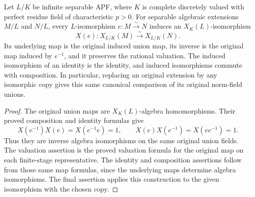 \begin{lemma}
\label{fw:separable-norm-union-congruence}
\leanok
Let $L/K$ be infinite separable APF, where $K$ is complete discretely
valued with perfect residue field of characteristic $p>0$.
For separable algebraic extensions $M/L$ and $N/L$, every
$L$-isomorphism $e:M\xrightarrow{\sim}N$ induces an
$X_K(L)$-isomorphism
\[
 X(e):X_{L/K}(M)\xrightarrow{\sim}X_{L/K}(N).
\]
Its underlying map is the original induced union map, its inverse is
the original map induced by $e^{-1}$, and it preserves the rational
valuation. The induced isomorphism of an identity is the identity,
and induced isomorphisms commute with composition. In particular,
replacing an original extension by any isomorphic copy gives this
same canonical comparison of its original norm-field unions.
\end{lemma}
\begin{proof}
The original union maps are $X_K(L)$-algebra homomorphisms.
Their proved composition and identity formulas give
\[
 X(e^{-1})X(e)=X(e^{-1}e)=1,
 \qquad X(e)X(e^{-1})=X(ee^{-1})=1.
\]
Thus they are inverse algebra isomorphisms on the same original
union fields. The valuation assertion is the proved valuation formula
for the original map on each finite-stage representative.
The identity and composition assertions follow from those same
map formulas, since the underlying maps determine algebra
isomorphisms. The final assertion applies this construction to the
given isomorphism with the chosen copy.
\end{proof}

